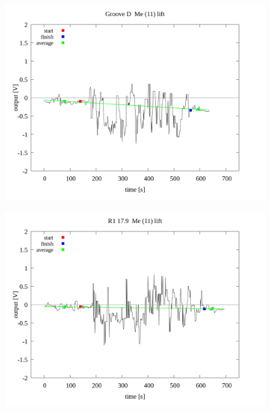 \documentclass[a4paper]{jsarticle}
\begin{document}
\begin{figure}[htbp]
    \footnotesize
    \begin{center}
        \includegraphics[width=140mm]{../../../../33_result/210806/median/11/lift/03/Groove_D_me(11)_lift_03.png}
    \end{center}
\end{figure}

\begin{figure}[htbp]
    \footnotesize
    \begin{center}
        \includegraphics[width=140mm]{../../../../33_result/210806/median/11/lift/03/R1_17.9_me(11)_lift_03.png}
    \end{center}
\end{figure}
\end{document}
